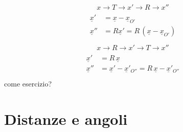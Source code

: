 \documentclass[letterpaper,10pt,italian]{jupyterBook}
\begin{document}
\sphinxAtStartPar
{} 
\begin{equation*}
\begin{split} x \rightarrow T \rightarrow x' \rightarrow R \rightarrow x''\end{split}
\end{equation*}\begin{equation*}
\begin{split}\begin{aligned}
\underline{x}' & = \underline{x} - \underline{x}_{O'} \\
\underline{x}'' & = R \underline{x}' = R \, (\underline{x} - \underline{x}_{O'}) \\
\end{aligned}\end{split}
\end{equation*}\begin{equation*}
\begin{split} x \rightarrow R \rightarrow x' \rightarrow T \rightarrow x''\end{split}
\end{equation*}\begin{equation*}
\begin{split}\begin{aligned}
\underline{x}'  & = R \, \underline{x}  \\
\underline{x}'' & = \underline{x}' - \underline{x}'_{O''} = R \, \underline{x} - \underline{x}'_{O''} \\ 
\end{aligned}\end{split}
\end{equation*}
\sphinxAtStartPar
{}  come esercizio?

\sphinxstepscope


\section{Distanze e angoli}
\label{\detokenize{ch/analytic_geometry/analytic_geometry_2d/points:distanze-e-angoli}}\label{\detokenize{ch/analytic_geometry/analytic_geometry_2d/points:geometry-analytic-2d-points}}\label{\detokenize{ch/analytic_geometry/analytic_geometry_2d/points::doc}}
\end{document}
